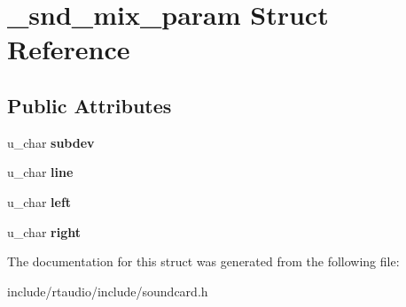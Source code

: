 \hypertarget{struct__snd__mix__param}{}\section{\+\_\+snd\+\_\+mix\+\_\+param Struct Reference}
\label{struct__snd__mix__param}
\subsection*{Public Attributes}
\begin{DoxyCompactItemize}
\item 
u\+\_\+char {\bfseries subdev}\hypertarget{struct__snd__mix__param_a355f7d6ad91cd371cb04198927c9eeae}{}\label{struct__snd__mix__param_a355f7d6ad91cd371cb04198927c9eeae}

\item 
u\+\_\+char {\bfseries line}\hypertarget{struct__snd__mix__param_a35eeaca81e262ba31c27d002d34eadb8}{}\label{struct__snd__mix__param_a35eeaca81e262ba31c27d002d34eadb8}

\item 
u\+\_\+char {\bfseries left}\hypertarget{struct__snd__mix__param_a410bbc1ef7ebdbe96f3cb8f4542e0aeb}{}\label{struct__snd__mix__param_a410bbc1ef7ebdbe96f3cb8f4542e0aeb}

\item 
u\+\_\+char {\bfseries right}\hypertarget{struct__snd__mix__param_a3ff5a1c66015b36cc8f98461c10c6229}{}\label{struct__snd__mix__param_a3ff5a1c66015b36cc8f98461c10c6229}

\end{DoxyCompactItemize}


The documentation for this struct was generated from the following file\+:\begin{DoxyCompactItemize}
\item 
include/rtaudio/include/soundcard.\+h\end{DoxyCompactItemize}
